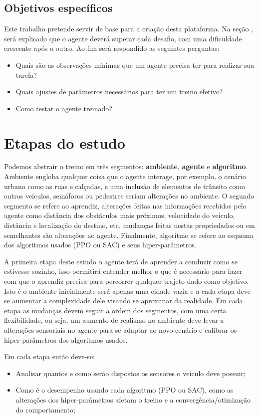 \subsection*{Objetivos específicos}
Este trabalho pretende servir de base para a criação desta plataforma. Na seção , será explicado que o agente deverá superar cada desafio, com uma dificuldade crescente após o outro. Ao fim será respondido as seguintes perguntas:

\begin{itemize}
    \item Quais são as observações mínimas que um agente precisa ter para realizar sua tarefa?
    \item Quais ajustes de parâmetros necessários para ter um treino efetivo?
    \item Como testar o agente treinado?
\end{itemize}

\section*{Etapas do estudo}\label{sec:etapas}
Podemos abstrair o treino em três segmentos: \textbf{ambiente}, \textbf{agente} e \textbf{algoritmo}. Ambiente engloba qualquer coisa que o agente interage, por exemplo, o cenário urbano como as ruas e calçadas, e uma inclusão de elementos de trânsito como outros veículos, semáforos ou pedestres seriam alterações no ambiente. O segundo segmento se refere ao aprendiz, alterações feitas nas informações recebidas pelo agente como distância dos obstáculos mais próximos, velocidade do veículo, distância e localização do destino, etc, mudanças feitas nestas propriedades ou em semelhantes são alterações no agente. Finalmente, algoritmo se refere ao esquema dos algoritmos usados (PPO ou SAC) e seus hiper-parâmetros.

A primeira etapa deste estudo o agente terá de aprender a conduzir como se estivesse sozinho, isso permitirá entender melhor o que é necessário para fazer com que o aprendiz precisa para percorrer qualquer trajeto dado como objetivo. Isto é o ambiente inicialmente será apenas uma cidade vazia e a cada etapa deve-se aumentar a complexidade dele visando se aproximar da realidade. Em cada etapa as mudanças devem seguir a ordem dos segmentos, com uma certa flexibilidade, ou seja, um aumento de realismo no ambiente deve levar a alterações sensoriais no agente para se adaptar ao novo cenário e calibrar os hiper-parâmetros dos algoritmos usados.

Em cada etapa então deve-se:
\begin{itemize}
    \item Analisar quantos e como serão dispostos os sensores o veículo deve possuir;
    \item Como é o desempenho usando cada algoritmo (PPO ou SAC), como as alterações dos hiper-parâmetros afetam o treino e a convergência/otimização do comportamento;
\end{itemize}